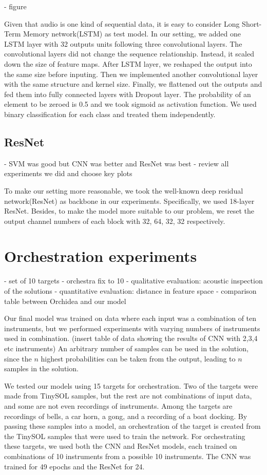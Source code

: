 \documentclass{article}
\begin{document}
- figure

Given that audio is one kind of sequential data, it is easy to consider Long Short-Term Memory network(LSTM) as test model. In our setting, we added one LSTM layer with 32 outputs units following three convolutional layers. The convolutional layers did not change the sequence relationship. Instead, it scaled down the size of feature maps. After LSTM layer, we reshaped the output into the same size before inputing. Then we implemented another convolutional layer with the same structure and kernel size. Finally, we flattened out the outputs and fed them into fully connected layers with Dropout layer. The probability of an element to be zeroed is 0.5 and we took sigmoid as activation function. We used binary classification for each class and treated them independently.  


\subsection{ResNet}
- SVM was good but CNN was better and ResNet was best
- review all experiments we did and choose key plots

To make our setting more reasonable, we took the well-known deep residual network(ResNet) as backbone in our experiments. Specifically, we used 18-layer ResNet. Besides, to make the model more suitable to our problem, we reset the output channel numbers of each block with 32, 64, 32, 32 respectively. 

\section{Orchestration experiments}
- set of 10 targets
- orchestra fix to 10
- qualitative evaluation: acoustic inspection of the solutions
- quantitative evaluation: distance in feature space
- comparison table between Orchidea and our model

Our final model was trained on data where each input was a combination of ten instruments, but we performed experiments with varying numbers of instruments used in combination. (insert table of data showing the results of CNN with 2,3,4 etc instruments) An arbitrary number of samples can be used in the solution, since the $n$ highest probabilities can be taken from the output, leading to $n$ samples in the solution.

We tested our models using 15 targets for orchestration. Two of the targets were made from TinySOL samples, but the rest are not combinations of input data, and some are not even recordings of instruments. Among the targets are recordings of bells, a car horn, a gong, and a recording of a boat docking. By passing these samples into a model, an orchestration of the target is created from the TinySOL samples that were used to train the network. For orchestrating these targets, we used both the CNN and ResNet models, each trained on combinations of 10 instruments from a possible 10 instruments. The CNN was trained for 49 epochs and the ResNet for 24.
\end{document}
